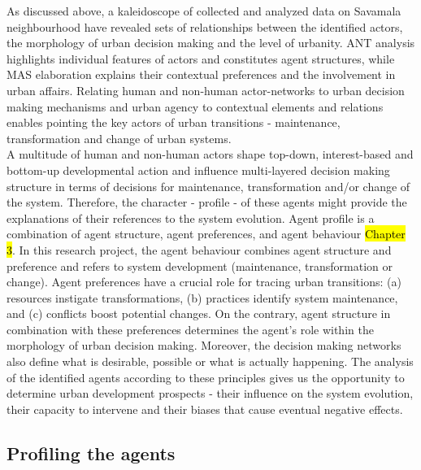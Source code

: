 \documentclass[11pt]{report}
\begin{document}
As discussed above, a kaleidoscope of collected and analyzed data on Savamala neighbourhood have revealed sets of relationships between the identified actors, the morphology of urban decision making and the level of urbanity.
ANT analysis highlights individual features of actors and constitutes agent structures, while MAS elaboration explains their contextual preferences and the involvement in urban affairs.
Relating human and non-human actor-networks to urban decision making mechanisms and urban agency to contextual elements and relations enables pointing the key actors of urban transitions - maintenance, transformation and change of urban systems.
\\
A multitude of human and non-human actors shape top-down, interest-based and bottom-up developmental action and influence multi-layered decision making structure in terms of decisions for maintenance, transformation and/or change of the system. 
Therefore, the character - profile - of these agents might provide the explanations of their references to the system evolution.
Agent profile is a combination of agent structure, agent preferences, and agent behaviour \hl{Chapter 3}.
In this research project, the agent behaviour combines agent structure and preference and refers to system development (maintenance, transformation or change). 
Agent preferences have a crucial role for tracing urban transitions: (a) resources instigate transformations, (b) practices identify system maintenance, and (c) conflicts boost potential changes.
On the contrary, agent structure in combination with these preferences determines the agent's role within the morphology of urban decision making. Moreover, the decision making networks also define what is desirable, possible or what is actually happening.
The analysis of the identified agents according to these principles gives us the opportunity to determine urban development prospects - their influence on the system evolution, their capacity to intervene and their biases that cause eventual negative effects.

\subsection{Profiling the agents}
\end{document}
